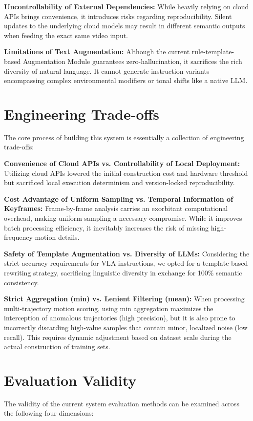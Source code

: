\documentclass[11pt,oneside]{report}
\begin{document}
\textbf{Uncontrollability of External Dependencies:} While heavily relying on cloud APIs brings convenience, it introduces risks regarding reproducibility. Silent updates to the underlying cloud models may result in different semantic outputs when feeding the exact same video input.

\textbf{Limitations of Text Augmentation:} Although the current rule-template-based Augmentation Module guarantees zero-hallucination, it sacrifices the rich diversity of natural language. It cannot generate instruction variants encompassing complex environmental modifiers or tonal shifts like a native LLM.

\section{Engineering Trade-offs}
The core process of building this system is essentially a collection of engineering trade-offs:

\textbf{Convenience of Cloud APIs vs. Controllability of Local Deployment:} Utilizing cloud APIs lowered the initial construction cost and hardware threshold but sacrificed local execution determinism and version-locked reproducibility.

\textbf{Cost Advantage of Uniform Sampling vs. Temporal Information of Keyframes:} Frame-by-frame analysis carries an exorbitant computational overhead, making uniform sampling a necessary compromise. While it improves batch processing efficiency, it inevitably increases the risk of missing high-frequency motion details.

\textbf{Safety of Template Augmentation vs. Diversity of LLMs:} Considering the strict accuracy requirements for VLA instructions, we opted for a template-based rewriting strategy, sacrificing linguistic diversity in exchange for 100\% semantic consistency.

\textbf{Strict Aggregation (min) vs. Lenient Filtering (mean):} When processing multi-trajectory motion scoring, using min aggregation maximizes the interception of anomalous trajectories (high precision), but it is also prone to incorrectly discarding high-value samples that contain minor, localized noise (low recall). This requires dynamic adjustment based on dataset scale during the actual construction of training sets.

\section{Evaluation Validity}
The validity of the current system evaluation methods can be examined across the following four dimensions:
\end{document}
